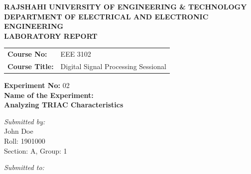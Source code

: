 \documentclass[12pt,a4paper]{article}
\begin{document}
\begin{titlepage}
    \sffamily
    \centering
    \vspace*{1cm}
    
    \Large \textbf{\MakeUppercase{ Rajshahi University of Engineering \& Technology }} \\
    \vspace{0.5cm}
    \large \textbf{\MakeUppercase{ Department of Electrical and Electronic Engineering }} \\
    
    \vspace{2.5cm}
    \Large \textbf{LABORATORY REPORT} \\
    \vspace{1cm}
    
    \begin{tabular}{ll}
        \textbf{Course No:} & EEE 3102 \\
        \textbf{Course Title:} & Digital Signal Processing Sessional \\
    \end{tabular}
    
    \vspace{2cm}
    
    \textbf{Experiment No:} 02 \\
    \vspace{0.5cm}
    \textbf{Name of the Experiment:} \\
    \Large \textbf{ Analyzing TRIAC Characteristics } \\
    
    \vspace{2.5cm}
    
    \begin{minipage}[t]{0.4\textwidth}
        \begin{flushleft} \large
            \emph{Submitted by:}\\
            John Doe \\
            Roll: 1901000 \\
            Section: A, Group: 1
        \end{flushleft}
    \end{minipage}
    \hfill
    \begin{minipage}[t]{0.5\textwidth}
        \begin{flushright} \large
            \emph{Submitted to:} \\
            

\end{flushright}
\end{minipage}
\end{titlepage}
\end{document}
